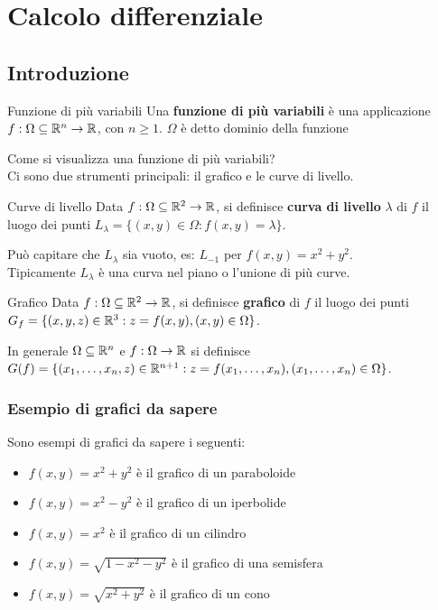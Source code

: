 \chapter{Calcolo differenziale}

\section{Introduzione}
\begin{definizione}{Funzione di più variabili}
Una \textbf{funzione di più variabili} è una applicazione $f:\Omega \subseteq \mathbb{R}^n \rightarrow \mathbb{R}$, con $n\geq 1.$ $\Omega$ è detto dominio della funzione\\
\end{definizione}

Come si visualizza una funzione di più variabili?\\
Ci sono due strumenti principali: il grafico e le curve di livello.\\

\begin{definizione}{Curve di livello}
Data $f:\Omega \subseteq \mathbb{R}^2 \rightarrow \mathbb{R}$, si definisce \textbf{curva di livello} $\lambda$ di $f$ il luogo dei punti $L_\lambda=\{(x,y)\in \Omega : f(x,y)=\lambda\}$.\\
\end{definizione}
Può capitare che $L_\lambda$ sia vuoto, es: $L_{-1}$ per $f(x,y)= x^2+y^2$.\\
Tipicamente $L_\lambda$ è una curva nel piano o l'unione di più curve.\\


\begin{definizione}{Grafico}
Data $f:\Omega \subseteq \mathbb{R}^2 \rightarrow \mathbb{R}$, si definisce \textbf{grafico} di $f$ il luogo dei punti $G_f=\{(x,y,z)\in \mathbb{R}^3 : z=f(x,y), (x,y)\in \Omega\}$.\\
\end{definizione}
In generale $\Omega \subseteq \mathbb{R}^n$ e $f:\Omega \rightarrow \mathbb{R}$ si definisce $G(f)=\{(x_1, \dots, x_n, z)\in \mathbb{R}^{n+1} : z=f(x_1, \dots, x_n), (x_1, \dots, x_n)\in \Omega\}$.\\

\subsection{Esempio di grafici da sapere}
Sono esempi di grafici da sapere i seguenti:
\begin{itemize}
  \item $f(x,y)=x^2+y^2$ è il grafico di un paraboloide
  \item $f(x,y)=x^2-y^2$ è il grafico di un iperbolide
  \item $f(x,y)=x^2$ è il grafico di un cilindro
  \item $f(x,y)=\sqrt{1-x^2-y^2}$ è il grafico di una semisfera
  \item $f(x,y)=\sqrt{x^2+y^2}$ è il grafico di un cono
\end{itemize}

